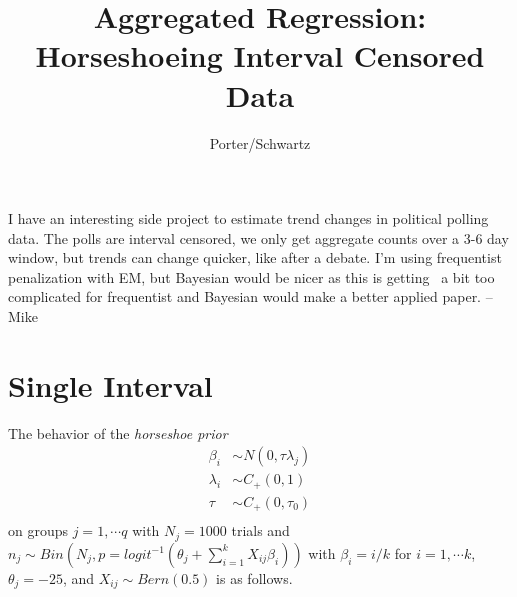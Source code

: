 \documentclass[11pt, oneside]{article}   	%
\title{Aggregated Regression: 
Horseshoeing Interval Censored Data}
\author{Porter/Schwartz}
\begin{document}
\maketitle

I have an interesting side project to estimate trend changes in political polling data. The polls are interval censored, we only get aggregate counts over a 3-6 day window, but trends can change quicker, like after a debate. I’m using frequentist penalization with EM, but Bayesian would be nicer as this is getting \
a bit too complicated for frequentist and Bayesian would make a better applied paper. -- Mike

\section{Single Interval}

The behavior of the \emph{horseshoe prior} 
\begin{align*}
\beta_i &\sim N(0, \tau \lambda_j)\\
\lambda_i &\sim C_+(0, 1)\\
\tau &\sim C_+(0, \tau_0)\\
\end{align*}
on groups $j = 1, \cdots q $ with $N_j=1000$ trials
and $n_j \sim Bin\left(N_j, p=logit^{-1}(\theta_j + \sum_{i=1}^k X_{ij} \beta_i )\right)$
with $\beta_i = i/k$ for $i = 1, \cdots k$, $\theta_j = -25$, 
and  $X_{ij} \sim Bern(0.5)$ is as follows.

\end{document}
